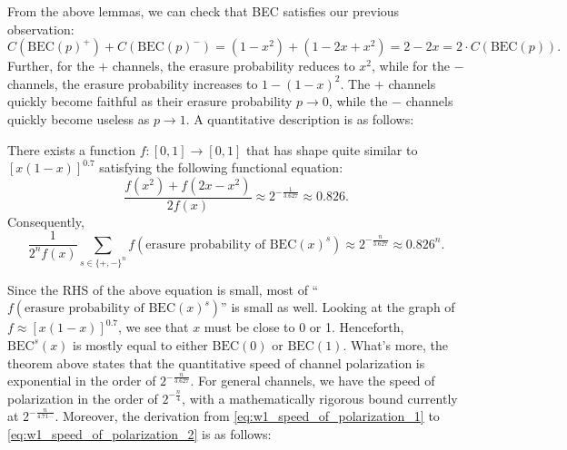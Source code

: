 From the above lemmas, we can check that BEC satisfies our previous observation:
\begin{equation*}
    C\left(\mathrm{BEC}(p)^{+}\right) + C\left(\mathrm{BEC}(p)^{-}\right) = (1-x^2) + (1-2x+x^2) = 2-2x = 2\cdot C\left(\mathrm{BEC}(p)\right).
\end{equation*}
Further, for the $+$ channels, the erasure probability reduces to $x^2$, while for the $-$ channels, the erasure probability increases to $1-(1-x)^2$. The $+$ channels quickly become faithful as their erasure probability $p\rightarrow 0$, while the $-$ channels quickly become useless as $p\rightarrow1$. A quantitative description is as follows:
\begin{theorem} \label{thm:w1_polar_speed}
    There exists a function $f:[0,1] \rightarrow [0,1]$ that has shape quite similar to $[x(1-x)]^{0.7}$ satisfying the following functional equation:
    \begin{equation}\label{eq:w1_speed_of_polarization_1}
        \frac{f(x^2) + f(2x-x^2)}{2f(x)} \approx 2^{-\frac{1}{3.627}} \approx 0.826.
    \end{equation}
    Consequently,
    \begin{equation}\label{eq:w1_speed_of_polarization_2}
        \frac{1}{2^nf(x)} \sum_{s\in\{+,-\}^n} f\left(\text{erasure probability of }\mathrm{BEC}(x)^s\right) \approx 2^{-\frac{n}{3.627}} \approx 0.826^n.
    \end{equation}
\end{theorem}
Since the RHS of the above equation is small, most of ``$f\left(\text{erasure probability of }\mathrm{BEC}(x)^s\right)$'' is small as well. Looking at the graph of $f\approx[x(1-x)]^{0.7}$, we see that $x$ must be close to 0 or 1. Henceforth, $\mathrm{BEC}^s(x)$ is mostly equal to either $\mathrm{BEC}(0)$ or $\mathrm{BEC}(1)$. What's more, the theorem above states that the quantitative speed of channel polarization is exponential in the order of $2^{-\frac{n}{3.627}}$. For general channels, we have the speed of polarization in the order of $2^{-\frac{n}{4}}$, with a mathematically rigorous bound currently at $2^{-\frac{n}{4.71\cdots}}$. Moreover, the derivation from \autoref{eq:w1_speed_of_polarization_1} to \autoref{eq:w1_speed_of_polarization_2} is as follows:
